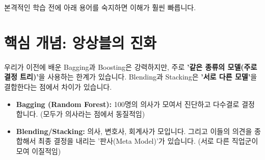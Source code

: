 \documentclass[11pt,a4paper]{book}
\theoremstyle{definition}
\begin{document}
본격적인 학습 전에 아래 용어를 숙지하면 이해가 훨씬 빠릅니다.

\begin{table}[h]
\centering
{}
\caption{앙상블 심화 학습을 위한 핵심 용어}
\end{table}


\section{핵심 개념: 앙상블의 진화}

우리가 이전에 배운 Bagging과 Boosting은 강력하지만, 주로 \textbf{'같은 종류의 모델(주로 결정 트리)'}을 사용하는 한계가 있습니다. Blending과 Stacking은 \textbf{'서로 다른 모델'}을 결합한다는 점에서 차이가 있습니다.

\begin{analogybox}[title={어벤져스 팀 구성하기}]
\begin{itemize}
    \item \textbf{Bagging (Random Forest):} 100명의 의사가 모여서 진단하고 다수결로 결정합니다. (모두가 의사라는 점에서 동질적임)
    \item \textbf{Blending/Stacking:} 의사, 변호사, 회계사가 모입니다. 그리고 이들의 의견을 종합해서 최종 결정을 내리는 '판사(Meta Model)'가 있습니다. (서로 다른 직업군이 모여 이질적임)
\end{itemize}
\end{analogybox}
\end{document}
